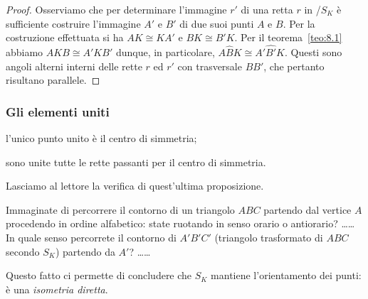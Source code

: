 \noindent\begin{minipage}{0.65\textwidth}\parindent15pt
\begin{proof}
Osserviamo che per determinare l'immagine $r'$ di una retta $r$ in 
/$S_K$ è sufficiente costruire l'immagine $A'$ e $B'$ di due suoi 
punti $A$ e $B$. Per la costruzione effettuata si ha $AK\cong KA'$ e 
$BK\cong B'K$. Per il teorema~\ref{teo:8.1} abbiamo $AKB\cong A'KB'$ 
dunque, in particolare, $A\widehat{B}K\cong A'\widehat{B'}K$. Questi 
sono angoli alterni interni delle rette $r$ ed $r'$ con trasversale 
$BB'$, che pertanto risultano parallele.
\end{proof}
\end{minipage}\hfil
\begin{minipage}{0.35\textwidth}
	
\centering
\end{minipage}\vspace{8pt}

\subsubsection{Gli elementi uniti}
\begin{itemize*}
\item l'unico punto unito è il centro di simmetria;
\item sono unite tutte le rette passanti per il centro di simmetria.
\end{itemize*}
Lasciamo al lettore la verifica di quest'ultima 
proposizione.\vspace{8pt}

Immaginate di percorrere il contorno di un triangolo $ABC$ partendo 
dal vertice $A$ procedendo in ordine alfabetico: state ruotando in 
senso orario o antiorario? \ldots\ldots{} In quale senso percorrete 
il contorno di $A'B'C'$ (triangolo trasformato di $ABC$ secondo 
$S_K$) partendo da $A'$? \ldots\ldots{}

Questo fatto ci permette di concludere che $S_K$ mantiene 
l'orientamento dei punti: è una \emph{isometria diretta}.

